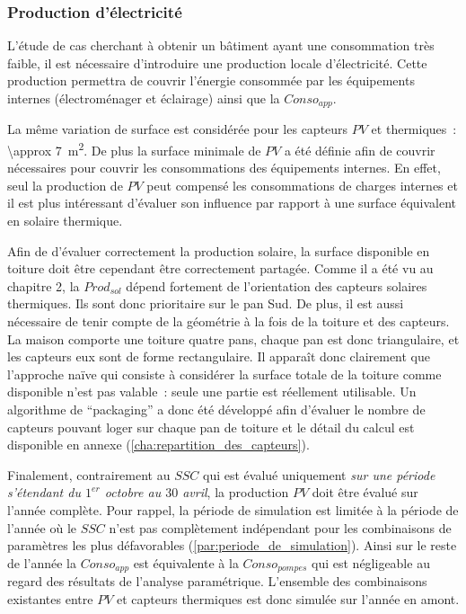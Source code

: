 \subsubsection{Production d’électricité} %
\label{ssub:production_d_électricite}
L’étude de cas cherchant à obtenir un bâtiment ayant une consommation très faible, il est
nécessaire d’introduire une production locale d’électricité. Cette production permettra de
couvrir l’énergie consommée par les équipements internes (électroménager et éclairage)
ainsi que la $Conso_{app}$.

La même variation de surface est considérée pour les capteurs $PV$ et thermiques~:
\SI{\approx 7}{\metre\squared}. De plus la surface minimale de $PV$ a été définie afin de couvrir  nécessaires pour couvrir les consommations
des équipements internes. En effet, seul la production de $PV$ peut compensé les
consommations de charges internes et il est plus intéressant d’évaluer son influence par
rapport à une surface équivalent en solaire thermique.

Afin de d’évaluer correctement la production solaire, la surface disponible en toiture
doit être cependant être correctement partagée. Comme il a été vu au chapitre 2, la
$Prod_{sol}$ dépend fortement de l’orientation des capteurs solaires thermiques. Ils sont
donc prioritaire sur le pan Sud. De plus, il est aussi nécessaire de tenir compte de la
géométrie à la fois de la toiture et des capteurs. La maison comporte une toiture quatre
pans, chaque pan est donc triangulaire, et les capteurs eux sont de forme rectangulaire.
Il apparaît donc clairement que l’approche naïve qui consiste à considérer la surface
totale de la toiture comme disponible n’est pas valable~: seule une partie est réellement
utilisable. Un algorithme de \enquote{packaging} a donc été développé afin d’évaluer le
nombre de capteurs pouvant loger sur chaque pan de toiture et le détail du calcul est
disponible en annexe (\ref{cha:repartition_des_capteurs}).

Finalement, contrairement au $SSC$ qui est évalué uniquement \emph{sur une période
s’étendant du $1^{er}$ octobre au $30$ avril}, la production $PV$ doit être évalué sur
l’année complète. Pour rappel, la période de simulation est limitée à la période de
l’année où le $SSC$ n’est pas complètement indépendant pour les combinaisons de paramètres
les plus défavorables (\ref{par:periode_de_simulation}). Ainsi sur le reste de l’année la
$Conso_{app}$ est équivalente à la $Conso_{pompes}$ qui est négligeable au regard des
résultats de l’analyse paramétrique. L’ensemble des combinaisons existantes entre $PV$ et
capteurs thermiques est donc simulée sur l’année en amont.

